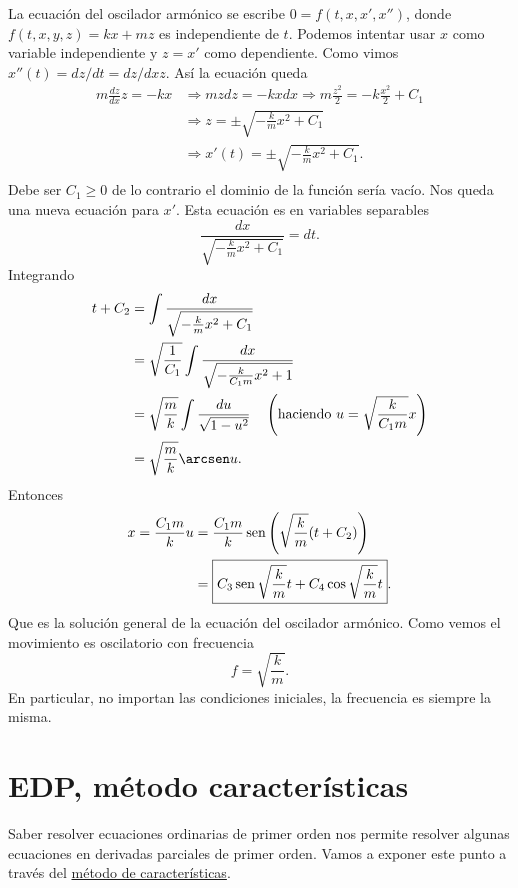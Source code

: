 La ecuación del oscilador armónico se escribe $0=f(t,x,x',x'')$, donde \linebreak $f(t,x,y,z)=kx+mz$ es independiente de $t$. Podemos intentar usar $x$ como variable
independiente y $z=x'$ como dependiente. Como vimos  $x''(t)=dz/dt=dz/dx z$. Así la ecuación queda
\[\begin{split}
   m\frac{dz}{dx}z=-kx &\Longrightarrow mzdz=-kxdx\Longrightarrow m\frac{z^2}{2}=-k\frac{x^2}{2}+C_1\\
   &\Longrightarrow z=\pm\sqrt{-\frac{k}{m}x^2+C_1}\\
   &\Longrightarrow x'(t)=\pm\sqrt{-\frac{k}{m}x^2+C_1}.\\
  \end{split}
\]
Debe ser $C_1\geq 0$ de lo contrario el dominio de la función sería vacío. Nos queda una nueva ecuación para $x'$.
Esta ecuación es en variables separables
\[ \frac{dx}{\sqrt{-\frac{k}{m}x^2+C_1}}=dt.
\]
 Integrando
\[\begin{split}
   t+C_2
   &=\int \frac{dx}{\sqrt{-\frac{k}{m}x^2+C_1}}\\
   &= \sqrt{\frac{1}{C_1}} \int \frac{dx}{\sqrt{-\frac{k}{C_1m}x^2+1}} \\
   &= \sqrt{\frac{m}{k}} \int \frac{du}{\sqrt{1-u^2}}\quad \left(\text{haciendo } u=\sqrt{\frac{k}{C_1m}}x\right)\\
   &=\sqrt{\frac{m}{k}}\arcsen u.
  \end{split}
\]
Entonces
\[\begin{split}
    x=\frac{C_1m}{k}u &=\frac{C_1m}{k}\sen \left(\sqrt{\frac{k}{m}}(t+C_2)\right)\\
    &=\boxed{C_3\sen \sqrt{\frac{k}{m}}t+C_4\cos \sqrt{\frac{k}{m}}t}.
  \end{split}
 \]
Que es la solución general de la ecuación del oscilador armónico. Como vemos el movimiento es oscilatorio con frecuencia
\[\boxed{f=\sqrt{\frac{k}{m}} }.\]
En particular, no importan las condiciones iniciales, la frecuencia es siempre la misma.






\section{EDP, método características}

Saber resolver ecuaciones ordinarias de primer orden nos permite resolver algunas ecuaciones en derivadas parciales de primer orden.  Vamos a exponer este punto a través del \href{https://en.wikipedia.org/wiki/Method_of_characteristics}{método de características}.

